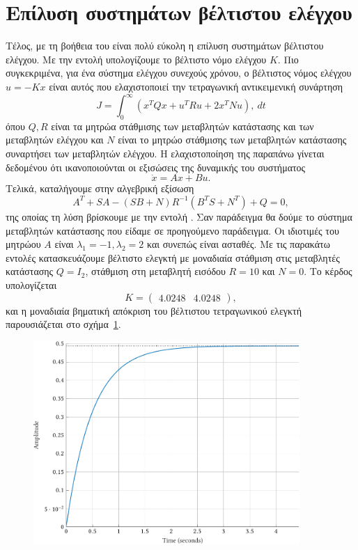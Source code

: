 \section{Επίλυση συστημάτων βέλτιστου ελέγχου}
Τέλος, με τη βοήθεια του  είναι πολύ εύκολη η επίλυση συστημάτων
βέλτιστου ελέγχου. Με την εντολή
υπολογίζουμε το βέλτιστο νόμο ελέγχου \( K \). Πιο συγκεκριμένα, για ένα σύστημα
ελέγχου συνεχούς χρόνου, ο βέλτιστος νόμος ελέγχου \( u = -Kx \) είναι αυτός που
ελαχιστοποιεί την τετραγωνική αντικειμενική συνάρτηση
\[
    J = \int_0^{\infty} \left( x^TQx + u^TRu + 2x^TNu \right) ,\ dt
\]
όπου \( Q, R \) είναι τα μητρώα στάθμισης των μεταβλητών κατάστασης και των
μεταβλητών ελέγχου και \( N \) είναι το μητρώο στάθμισης των μεταβλητών
κατάστασης συναρτήσει των μεταβλητών ελέγχου. Η ελαχιστοποίηση της παραπάνω
γίνεται δεδομένου ότι ικανοποιούνται οι εξισώσεις της δυναμικής του συστήματος
\[
    \dot{x} = Ax + Bu.
\]
Τελικά, καταλήγουμε στην αλγεβρική εξίσωση 
\[
    A^T + SA - (SB + N)R^{-1}(B^TS + N^T) + Q = 0,
\]
της οποίας τη λύση βρίσκουμε με την εντολή . Σαν παράδειγμα θα δούμε
το σύστημα μεταβλητών κατάστασης που είδαμε σε προηγούμενο παράδειγμα. Οι
ιδιοτιμές του μητρώου \( A \) είναι \( \lambda_1 = -1, \lambda_2 = 2 \)
και συνεπώς είναι ασταθές. Με τις παρακάτω εντολές κατασκευάζουμε βέλτιστο
ελεγκτή με μοναδιαία στάθμιση στις μεταβλητές κατάστασης \( Q = I_2 \),
στάθμιση στη μεταβλητή εισόδου \( R = 10 \) και \( N = 0 \).
\eng{}
Το κέρδος υπολογίζεται
\[
    K = \begin{pmatrix}4.0248 & 4.0248\end{pmatrix},
\]
και η μοναδιαία βηματική απόκριση του βέλτιστου τετραγωνικού ελεγκτή
παρουσιάζεται στο σχήμα~\ref{fig:prelim8}.
\begin{figure}[h]
    \centering
    \includegraphics[width=0.9\textwidth]{figures/prelim8.pdf}
    \label{fig:prelim8}
\end{figure}
